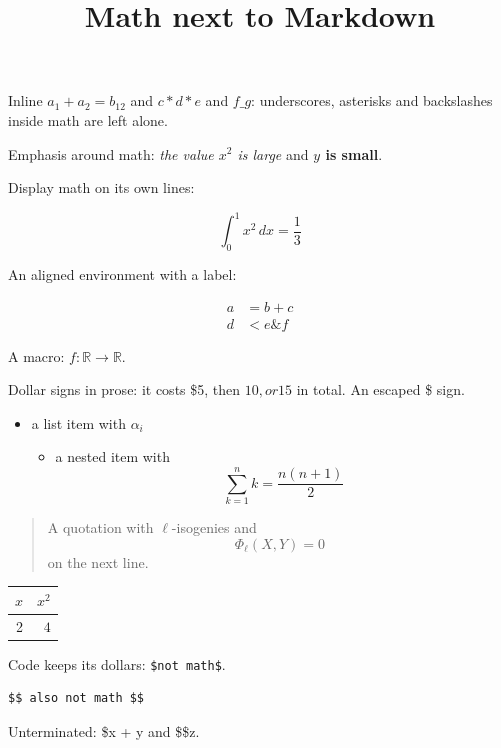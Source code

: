 \documentclass{amsart}
\theoremstyle{definition}
\theoremstyle{remark}
\begin{document}
\title{Math next to Markdown}
\maketitle

Inline \(a_1 + a_2 = b_{12}\) and \(c*d*e\) and \(f\_g\): underscores, asterisks and
backslashes inside math are left alone.

Emphasis around math: \emph{the value \(x^2\) is large} and \textbf{\(y\) is small}.

Display math on its own lines:

\[
\int_0^1 x^2 \, dx = \frac{1}{3}
\]

An aligned environment with a label:

\begin{align}
a &= b + c \label{eq:first} \\
d &< e \& f
\end{align}

A macro: \newcommand{\R}{\mathbb{R}} \(f\colon \R \to \R\).

Dollar signs in prose: it costs \$5, then \(10, or 15\) in total. An escaped \$ sign.

\begin{itemize}
\item a list item with \(\alpha_i\)\begin{itemize}
\item a nested item with
\[
\sum_{k=1}^n k = \frac{n(n+1)}{2}
\]

\end{itemize}


\end{itemize}

\begin{quote}
A quotation with \(\ell\)-isogenies
and
\[
\Phi_\ell(X, Y) = 0
\]
on the next line.

\end{quote}

\begin{center}
\begin{tabular}{rr}
\hline
\(x\) & \(x^2\) \\
\hline
2 & \(4\) \\
\hline
\end{tabular}
\end{center}

Code keeps its dollars: \texttt{\$not math\$}.

\begin{verbatim}
$$ also not math $$
\end{verbatim}

Unterminated: \$x + y and \$\$z.
\end{document}
